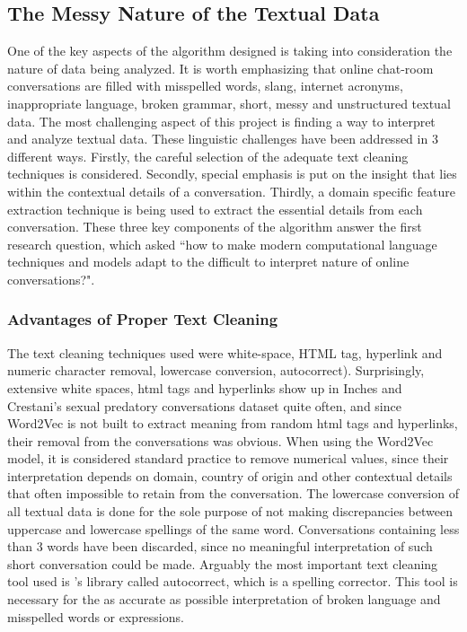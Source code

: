 \documentclass[11pt]{article}
\begin{document}
\subsection{The Messy Nature of the Textual Data}
One of the key aspects of the algorithm designed is taking into consideration the nature of data being analyzed. It is worth emphasizing that online chat-room conversations are filled with misspelled words, slang, internet acronyms, inappropriate language, broken grammar, short, messy and unstructured textual data. The most challenging aspect of this project is finding a way to interpret and analyze textual data. These linguistic challenges have been addressed in 3 different ways. Firstly, the careful selection of the adequate text cleaning techniques is considered. Secondly, special emphasis is put on the insight that lies within the contextual details of a conversation. Thirdly, a domain specific feature extraction technique is being used to extract the essential details from each conversation. These three key components of the algorithm answer the first research question, which asked ``how to make modern computational language techniques and models adapt to the difficult to interpret nature of online conversations?".

\subsubsection{Advantages of Proper Text Cleaning}
The text cleaning techniques used were white-space, HTML tag, hyperlink and numeric character removal, lowercase conversion, autocorrect). Surprisingly, extensive white spaces, html tags and hyperlinks show up in Inches and Crestani's sexual predatory conversations dataset quite often, and since Word2Vec is not built to extract meaning from random html tags and hyperlinks, their removal from the conversations was obvious. When using the Word2Vec model, it is considered standard practice to remove numerical values, since their interpretation depends on domain, country of origin and other contextual details that often impossible to retain from the conversation. The lowercase conversion of all textual data is done for the sole purpose of not making discrepancies between uppercase and lowercase spellings of the same word. Conversations containing less than 3 words have been discarded, since no meaningful interpretation of such short conversation could be made. Arguably the most important text cleaning tool used is \cite{mccallum_2016}'s library called autocorrect, which is a spelling corrector. This tool is necessary for the as accurate as possible interpretation of broken language and misspelled words or expressions.
\end{document}
